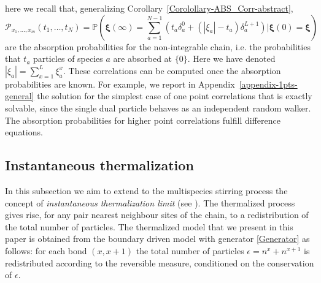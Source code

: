 \documentclass[10pt]{article}
\numberwithin{equation}{section}
\numberwithin{equation}{subsection}
\begin{document}
here we recall that, generalizing Corollary~\ref{Corolollary-ABS_Corr-abstract}, %
\begin{equation}\label{Pass} 
	\mathcal{P}_{x_{1},\ldots,x_{m}}(t_{1},\ldots,t_{N})	=\mathbb{P}\left(\bm{\xi}(\infty)=\sum_{a=1}^{N-1}\left(t_{a}\delta_{a}^{0}+(|\xi_{a}|-t_{a})\delta_{a}^{L+1}\right)| \bm{\xi}(0)=\bm{\xi}\right)
\end{equation}
are the absorption probabilities for the non-integrable chain, i.e. the probabilities that $t_{a}$ particles of species $a$ are absorbed at $\{0\}$. Here we have denoted $|\xi_{a}|=\sum_{x=1}^{L}\xi_{a}^{x}$.
 These correlations can be computed once the absorption probabilities are known. For example, we report in Appendix~\ref{appendix-1pts-general} the solution for the simplest case of one point correlations that is exactly solvable, since the single dual particle behaves as an independent random walker. The absorption probabilities for higher point correlations fulfill  difference equations.


\subsection{Instantaneous thermalization}\label{Subsection-Thermalized}
In this subsection we aim to extend to the multispecies stirring process the concept of \textit{instantaneous thermalization limit} (see \cite{carinci2013duality,KMP}). The thermalized process gives rise, for any pair nearest neighbour sites of the chain, to a redistribution of the total number of particles. The thermalized model that we present in this paper is obtained from the boundary driven model with generator \eqref{Generator} as follows: for each bond $(x,x+1)$ the total number of particles $\epsilon=n^{x}+n^{x+1}$ is redistributed according to the reversible measure, conditioned on the conservation of $\epsilon$. 
\end{document}
